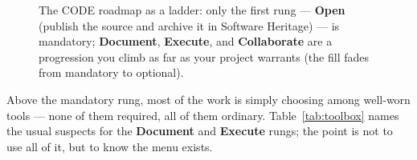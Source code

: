 \begin{figure}[htbp]
  \centering
  \caption[The CODE roadmap]{The CODE roadmap as a ladder: only the first rung --- \textbf{Open}
  (publish the source and archive it in Software Heritage) --- is mandatory; \textbf{Document},
  \textbf{Execute}, and \textbf{Collaborate} are a progression you climb as far as your project
  warrants (the fill fades from mandatory to optional).}
  \label{fig:code}
\end{figure}


Above the mandatory rung, most of the work is simply choosing among well-worn tools --- none of them
required, all of them ordinary. Table~\ref{tab:toolbox} names the usual suspects for the
\textbf{Document} and \textbf{Execute} rungs; the point is not to use all of it, but to know the menu
exists.

